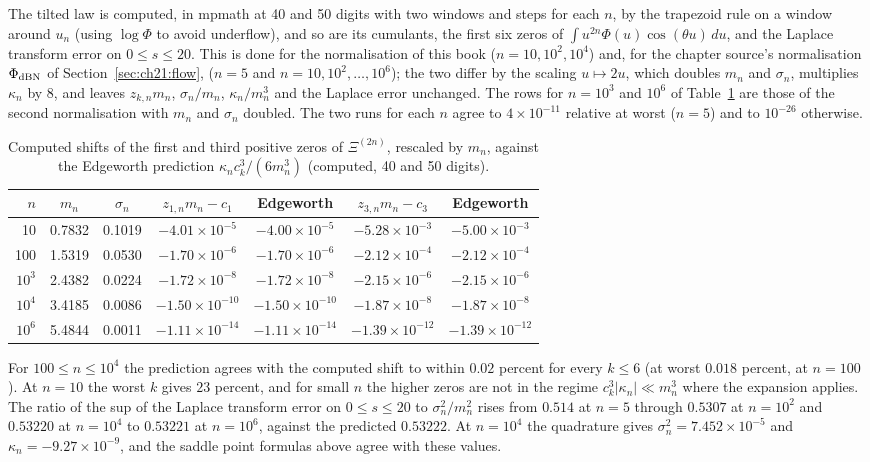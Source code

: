 The tilted law is computed, in mpmath at 40 and 50 digits with two windows and steps for each $n$, by the trapezoid rule on a window around $u_n$ (using $\log\Phi$ to avoid underflow), and so are its cumulants, the first six zeros of $\int u^{2n}\Phi(u)\cos(\theta u)\,du$, and the Laplace transform error on $0\le s\le20$. This is done for the normalisation of this book ($n=10,10^2,10^4$) and, for the chapter source's normalisation $\Phi_{\rm dBN}$ of Section~\ref{sec:ch21:flow}, ($n=5$ and $n=10,10^2,\dots,10^6$); the two differ by the scaling $u\mapsto2u$, which doubles $m_n$ and $\sigma_n$, multiplies $\kappa_n$ by $8$, and leaves $z_{k,n}m_n$, $\sigma_n/m_n$, $\kappa_n/m_n^3$ and the Laplace error unchanged. The rows for $n=10^3$ and $10^6$ of Table~\ref{ki:tab:rate} are those of the second normalisation with $m_n$ and $\sigma_n$ doubled. The two runs for each $n$ agree to $4\times10^{-11}$ relative at worst ($n=5$) and to $10^{-26}$ otherwise.

\begin{table}[h]
\centering\scriptsize\setlength{\tabcolsep}{3pt}
\begin{tabular}{rcccccc}
\toprule
$n$ & $m_n$ & $\sigma_n$ & $z_{1,n}m_n-c_1$ & Edgeworth & $z_{3,n}m_n-c_3$ & Edgeworth\\
\midrule
10 & 0.7832 & 0.1019 & $-4.01\times10^{-5}$ & $-4.00\times10^{-5}$ & $-5.28\times10^{-3}$ & $-5.00\times10^{-3}$\\
100 & 1.5319 & 0.0530 & $-1.70\times10^{-6}$ & $-1.70\times10^{-6}$ & $-2.12\times10^{-4}$ & $-2.12\times10^{-4}$\\
$10^3$ & 2.4382 & 0.0224 & $-1.72\times10^{-8}$ & $-1.72\times10^{-8}$ & $-2.15\times10^{-6}$ & $-2.15\times10^{-6}$\\
$10^4$ & 3.4185 & 0.0086 & $-1.50\times10^{-10}$ & $-1.50\times10^{-10}$ & $-1.87\times10^{-8}$ & $-1.87\times10^{-8}$\\
$10^6$ & 5.4844 & 0.0011 & $-1.11\times10^{-14}$ & $-1.11\times10^{-14}$ & $-1.39\times10^{-12}$ & $-1.39\times10^{-12}$\\
\bottomrule
\end{tabular}
\caption{Computed shifts of the first and third positive zeros of $\Xi^{(2n)}$, rescaled by $m_n$, against the Edgeworth prediction $\kappa_nc_k^3/(6m_n^3)$ (computed, 40 and 50 digits).}\label{ki:tab:rate}
\end{table}

For $100\le n\le10^4$ the prediction agrees with the computed shift to within $0.02$ percent for every $k\le6$ (at worst $0.018$ percent, at $n=100$). At $n=10$ the worst $k$ gives $23$ percent, and for small $n$ the higher zeros are not in the regime $c_k^3|\kappa_n|\ll m_n^3$ where the expansion applies. The ratio of the sup of the Laplace transform error on $0\le s\le20$ to $\sigma_n^2/m_n^2$ rises from $0.514$ at $n=5$ through $0.5307$ at $n=10^2$ and $0.53220$ at $n=10^4$ to $0.53221$ at $n=10^6$, against the predicted $0.53222$. At $n=10^4$ the quadrature gives $\sigma_n^2=7.452\times10^{-5}$ and $\kappa_n=-9.27\times10^{-9}$, and the saddle point formulas above agree with these values.


